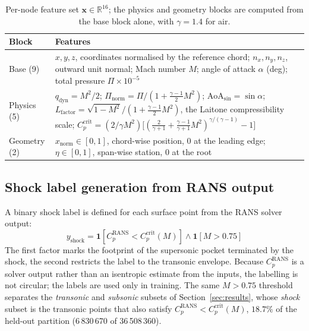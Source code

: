 \documentclass{WCCM-ECCOMAS_2026_Full_Paper}
\begin{document}
\begin{table}[htbp]
\centering
\scriptsize
\caption{Per-node feature set $\mathbf{x}\in\mathbb{R}^{16}$; the
  physics and geometry blocks are computed from the base block alone,
  with $\gamma=1.4$ for air.}
\label{tab:features}
\begin{tabular}{lp{117mm}}
\toprule
\textbf{Block} & \textbf{Features} \\
\midrule
Base (9) & $x,y,z$, coordinates normalised by the reference chord;
  $n_x,n_y,n_z$, outward unit normal; Mach number $M$; angle of attack
  $\alpha$ (deg); total pressure $\Pi{\times}10^{-5}$ \\
Physics (5) & $q_{\mathrm{dyn}}=M^{2}/2$;
  $\Pi_{\mathrm{norm}}=\Pi/(1+\tfrac{\gamma-1}{2}M^{2})$;
  $\mathrm{AoA}_{\sin}=\sin\alpha$;
  $L_{\mathrm{factor}}=\sqrt{1-M^{2}}/(1+\tfrac{\gamma-1}{2}M^{2})$,
  the Laitone compressibility scale;
  $C_{p}^{\mathrm{crit}}=(2/\gamma M^{2})\bigl[(\tfrac{2}{\gamma+1}
  +\tfrac{\gamma-1}{\gamma+1}M^{2})^{\gamma/(\gamma-1)}-1\bigr]$ \\
Geometry (2) & $x_{\mathrm{norm}}\in[0,1]$, chord-wise position, 0 at
  the leading edge; $\eta\in[0,1]$, span-wise station, 0 at the root \\
\bottomrule
\end{tabular}
\end{table}

\subsection{Shock label generation from RANS output}

A binary shock label is defined for each surface point from the RANS
solver output:
\begin{equation}
  y_{\mathrm{shock}} =
    \mathbf{1}\!\left[C_{p}^{\mathrm{RANS}} <
                      C_{p}^{\mathrm{crit}}(M)\right]
    \wedge
    \mathbf{1}\!\left[M > 0.75\right]
  \label{eq:labels}
\end{equation}
The first factor marks the footprint of the supersonic pocket
terminated by the shock, the second restricts the label to the
transonic envelope.  Because $C_{p}^{\mathrm{RANS}}$ is a solver
output rather than an isentropic estimate from the inputs, the
labelling is not circular; the labels are used only in training.  The
same $M > 0.75$ threshold separates the \emph{transonic} and
\emph{subsonic} subsets of Section~\ref{sec:results}, whose
\emph{shock} subset is the transonic points that also satisfy
$C_{p}^{\mathrm{RANS}} < C_{p}^{\mathrm{crit}}(M)$, $18.7\%$ of the
held-out partition (6\,830\,670 of 36\,508\,360).
\end{document}
